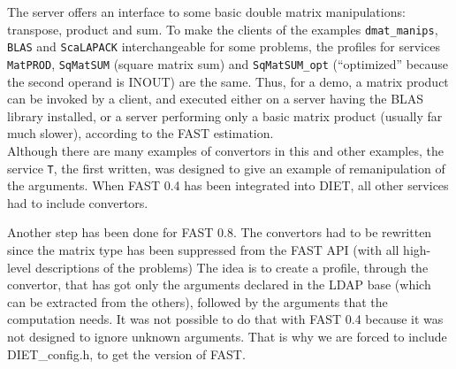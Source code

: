         The server offers an interface to some basic double matrix manipulations:
        transpose, product and sum. To make the clients of the examples
        \texttt{dmat\_manips}, \texttt{BLAS} and \texttt{ScaLAPACK} interchangeable for
        some problems, the profiles for services \texttt{MatPROD}, \texttt{SqMatSUM}
        (square matrix sum) and \texttt{SqMatSUM\_opt} (``optimized'' because the second
                                                        operand is INOUT) are the same. Thus, for a demo, a matrix product can be
        invoked by a client, and executed either on a server having the BLAS library
        installed, or a server performing only a basic matrix product (usually far much
            slower), according to the FAST estimation.
        \\

        Although there are many examples of convertors in this and other examples, the
        service \texttt{T}, the first written, was designed to give an example of
        remanipulation of the arguments. When FAST 0.4 has been integrated into DIET,
        all other services had to include convertors.

        Another step has been done for FAST 0.8. The convertors had to be rewritten
        since the matrix type has been suppressed from the FAST API (with all high-level
            descriptions of the problems) The idea is to create a profile, through the
        convertor, that has got only the arguments declared in the LDAP base (which can
            be extracted from the others), followed by the arguments that the computation
        needs. It was not possible to do that with FAST 0.4 because it was not designed
        to ignore unknown arguments. That is why we are forced to include
        \textsf{DIET\_config.h}, to get the version of FAST.
        \\

